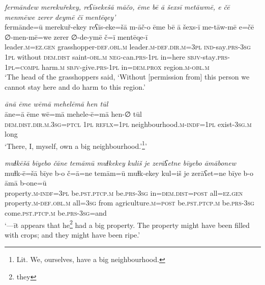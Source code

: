 \ea \label{PM.5}
\textit{fermāndew merekuřekey, reʕīsekešā māčo, ēme bē ā šexsī metāwmē, e čē menmēwe zerer deymē čī mentēqey’} \\ 
\gll fermānde=ū merekuř-ekey reʕīs-eke=šā m-āč-o ēme bē ā šexs-ī me-tāw-mē e=čē ∅-men-mē=we zerer ∅-de-ymē č=ī mentēqe-ī \\ 
 leader\textsc{.m}\textsc{\textsc{=ez.gen}} grasshopper\textsc{-def}\textsc{.obl}\textsc{.m} leader\textsc{.m}\textsc{-def}\textsc{.dir}\textsc{.m}\textsc{=3pl} \textsc{ind-}say\textsc{.prs}\textsc{-3sg} \textsc{1pl} without \textsc{dem.dist} saint\textsc{-obl}\textsc{.m} \textsc{neg-}can\textsc{.prs}\textsc{-1pl} in=here \textsc{sbjv-}stay\textsc{.prs}\textsc{-1pl}\textsc{=compl} harm\textsc{.m} \textsc{sbjv-}give\textsc{.prs}-\textsc{1pl} in=\textsc{dem.prox} region\textsc{.m}\textsc{-obl}\textsc{.m} \\ 
\glt `The head of the grasshoppers said, ‘Without [permission from] this person we cannot stay here and do harm to this region.'
\z 
 
\ea \label{PM.17}
\textit{ānā ēme wēmā mehelēmā hen tūl} \\ 
\gll āne=ā ēme wē=mā mehele-ē=mā hen-∅ tūl \\ 
 \textsc{dem.dist}\textsc{.dir}\textsc{.m}\textsc{.3sg}=\textsc{ptcl} \textsc{1pl} \textsc{reflx}\textsc{=1pl} neighbourhood\textsc{.m}\textsc{-indf}\textsc{=1pl} exist\textsc{-3sg}\textsc{.m} long \\ 
\glt `There, I, myself, own a big neighbourhood.’\footnote{Lit. We, ourselves, have a big neighbourhood.}'
\z 
 
\ea \label{PM.18}
\textit{muɫkēšā bīyebo čāne temāmū muɫkekey kuliš je zerāʕetne bīyebo āmābonew} \\ 
\gll muɫk-ē=šā bīye b-o č=ā=ne temām=ū muɫk-ekey kul=iš je zerāʕet=ne bīye b-o āmā b-one=ū \\ 
 property\textsc{.m}\textsc{-indf}\textsc{=3pl} be\textsc{.pst}\textsc{.ptcp}\textsc{.m} be\textsc{.prs}\textsc{-3sg} in=\textsc{dem.dist}\textsc{=\textsc{post}} all\textsc{\textsc{=ez.gen}} property\textsc{.m}\textsc{-def}\textsc{.obl}\textsc{.m} all\textsc{=3sg} from agriculture\textsc{.m}\textsc{=\textsc{post}} be\textsc{.pst}\textsc{.ptcp}\textsc{.m} be\textsc{.prs}\textsc{-3sg} come\textsc{.pst}\textsc{.ptcp}\textsc{.m} be\textsc{.prs}\textsc{-3sg}=and \\ 
\glt `—īt appears that he\footnote{they} had a big property. The property might have been filled with crops; and they might have been ripe.'
\z 
 
